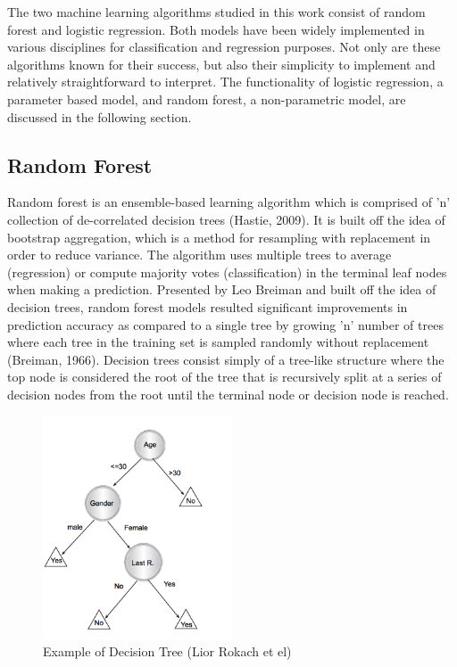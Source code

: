 \documentclass{llncs}
\begin{document}
The two machine learning algorithms studied in this work consist of random forest and logistic regression. Both models have been widely implemented in various disciplines for classification and regression purposes. Not only are these algorithms known for their success, but also their simplicity to implement and relatively straightforward to interpret. The functionality of logistic regression, a parameter based model, and random forest, a non-parametric model, are discussed in the following section. 

\subsection{Random Forest}


Random forest is an ensemble-based learning algorithm which is comprised of 'n' collection of de-correlated decision trees (Hastie, 2009). It is built off the idea of bootstrap aggregation, which is a method for resampling with replacement in order to reduce variance. The algorithm uses multiple trees to average (regression) or compute majority votes (classification) in the terminal leaf nodes when making a prediction. Presented by Leo Breiman and built off the idea of decision trees, random forest models resulted significant improvements in prediction accuracy as compared to a single tree by growing 'n' number of trees where each tree in the training set is sampled randomly without replacement (Breiman, 1966). Decision trees consist simply of a tree-like structure where the top node is considered the root of the tree that is recursively split at a series of decision nodes from the root until the terminal node or decision node is reached. 


\begin{figure}
\centering
\includegraphics[width=0.5\textwidth]{decisiontree.png}
\caption{Example of Decision Tree (Lior Rokach et el)}
\end{figure}
\end{document}
